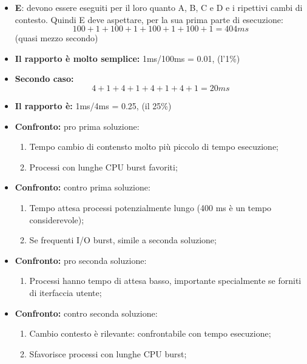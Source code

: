 \documentclass{article}
\begin{document}
\begin{itemize}

\item \textbf{E}: devono essere eseguiti per il loro quanto A, B, C e D e i ripettivi cambi di contesto. Quindi E deve aspettare, per la sua prima parte di esecuzione:
\[100 + 1 + 100 +1 + 100 + 1 + 100 + 1 =404 ms\]
(quasi mezzo secondo)
\item \textbf{Il rapporto è molto semplice:} 1ms/100ms = 0.01, (l’1\%)

\vskip 0.5cm

\item \textbf{Secondo caso:} \[4 + 1 + 4 + 1 + 4 + 1 + 4 + 1 =20 ms\]
\item  \textbf{Il rapporto è:} 1ms/4ms = 0.25, (il 25\%)

\vskip 0.5cm

\item \textbf{Confronto:} pro prima soluzione:
\begin{enumerate}
    \item Tempo cambio di contensto molto più piccolo di tempo esecuzione;
    \item Processi con lunghe CPU burst favoriti;
\end{enumerate}

\item  \textbf{Confronto:} contro prima soluzione:
\begin{enumerate}
    \item  Tempo attesa processi potenzialmente lungo (400 ms è un tempo considerevole);
    \item Se frequenti I/O burst, simile a seconda soluzione;
\end{enumerate}

\item  \textbf{Confronto:} pro seconda soluzione:
\begin{enumerate}
    \item  Processi hanno tempo di attesa basso, importante specialmente se forniti di iterfaccia utente;
\end{enumerate}
\item  \textbf{Confronto:} contro seconda soluzione:
\begin{enumerate}
    \item  Cambio contesto è rilevante: confrontabile con tempo esecuzione;
    \item  Sfavorisce processi con lunghe CPU burst;
\end{enumerate}
\end{itemize}
\end{document}
